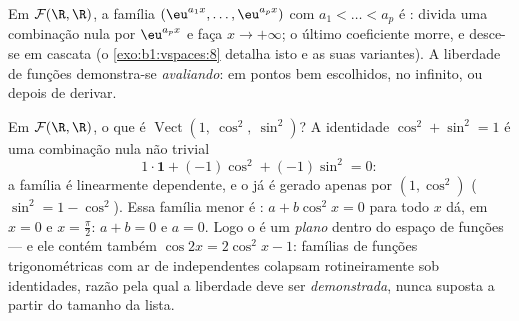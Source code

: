 \begin{example}\label{ex:b1:vspaces:functionfree}
Em $\mathcal{F}(\R,\R)$, a família $(\eu^{a_1 x}, \dots, \eu^{a_p
x})$ com $a_1 < \dots < a_p$ é : divida uma combinação
nula por $\eu^{a_p x}$ e faça $x \to +\infty$; o último coeficiente morre, e desce-se
em cascata (o \cref{exo:b1:vspaces:8} detalha isto e as suas variantes). A liberdade de
funções demonstra-se \emph{avaliando}: em pontos bem escolhidos, no
infinito, ou depois de derivar.
\end{example}

\begin{example}
\label{ex:b1:vspaces:hiddenrelation}
Em $\mathcal{F}(\R, \R)$, o que é $\operatorname{Vect}(1,\ \cos^2,\ \sin^2)$? A identidade $\cos^2 + \sin^2 = 1$ é uma combinação nula
não trivial
\[
1\cdot\mathbf{1} + (-1)\cos^2 + (-1)\sin^2 = 0 :
\]
a família é linearmente dependente, e o  já é gerado
apenas por $(1, \cos^2)$ ($\sin^2 = 1 - \cos^2$). Essa família menor é : $a + b\cos^2 x = 0$ para todo
$x$ dá, em $x = 0$ e $x = \frac\pi2$: $a + b = 0$ e $a = 0$. Logo o  é
um \emph{plano} dentro do espaço de funções --- e ele contém também
$\cos 2x = 2\cos^2 x - 1$: famílias de funções trigonométricas com ar de independentes
colapsam rotineiramente sob identidades, razão pela qual a liberdade
deve ser \emph{demonstrada}, nunca suposta a partir do tamanho da
lista.
\end{example}

